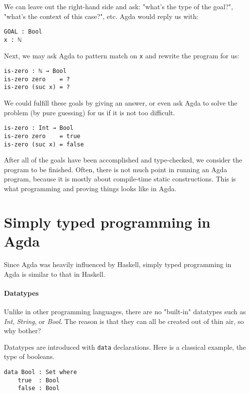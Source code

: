 \documentclass[../thesis.tex]{subfiles}
\begin{document}
We can leave out the right-hand side and ask:
"what's the type of the goal?", "what's the context of this case?", etc.
Agda would reply us with:

\begin{lstlisting}
GOAL : Bool
x : ℕ
\end{lstlisting}

Next, we may ask Agda to pattern match on {\lstinline|x|} and rewrite the program for us:

\begin{lstlisting}
is-zero : ℕ → Bool
is-zero zero    = ?
is-zero (suc x) = ?
\end{lstlisting}

We could fulfill these goals by giving an answer,
or even ask Agda to solve the problem (by pure guessing) for us if it is not too difficult.

\begin{lstlisting}
is-zero : Int → Bool
is-zero zero    = true
is-zero (suc x) = false
\end{lstlisting}

After all of the goals have been accomplished and type-checked,
we consider the program to be finished.
Often, there is not much point in running an Agda program,
because it is mostly about compile-time static constructions.
This is what programming and proving things looks like in Agda.

\section{Simply typed programming in Agda}

Since Agda was heavily influenced by Haskell, simply typed programming in Agda
is similar to that in Haskell.

\paragraph{Datatypes}


Unlike in other programming languages, there are no "built-in"
datatypes such as \textit{Int}, \textit{String}, or \textit{Bool}.
The reason is that they can all be created out of thin air, so why bother?

Datatypes are introduced with {\lstinline|data|} declarations.
Here is a classical example, the type of booleans.

\begin{lstlisting}
data Bool : Set where
    true  : Bool
    false : Bool
\end{lstlisting}
\end{document}
